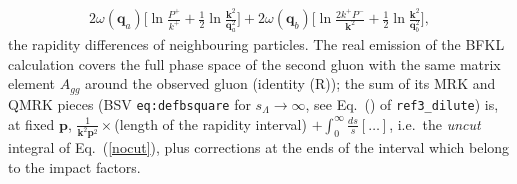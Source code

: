 \documentclass[11pt,a4paper]{article}
\renewcommand{\v}[1]{\bm{#1}}
\newcommand{\dref}[1]{\texttt{\detokenize{#1}}}
\begin{document}
\begin{align}
2\omega(\v q_a)\Big[\ln\frac{P^+}{k^+}+\frac12\ln\frac{\v k^2}{\v q_a^2}\Big]+2\omega(\v q_b)\Big[\ln\frac{2k^+P^-}{\v k^2}+\frac12\ln\frac{\v k^2}{\v q_b^2}\Big],\label{FLlogs}
\end{align}
the rapidity differences of neighbouring particles. The real emission of the BFKL calculation covers the full phase space of the second gluon with the same matrix element $A_{gg}$ around the observed gluon (identity (R)); the sum of its MRK and QMRK pieces (BSV \texttt{eq:defbsquare} for $s_\Lambda\to\infty$, see Eq.~(\dref{d:schemeid}) of \texttt{ref3\_dilute}) is, at fixed $\v p$, $\frac{1}{\v k^2\v p^2}\times$(length of the rapidity interval) $+\int_0^\infty\frac{ds}{s}[\dots]$, i.e.\ the \emph{uncut} integral of Eq.~(\ref{nocut}), plus corrections at the ends of the interval which belong to the impact factors.
\end{document}
